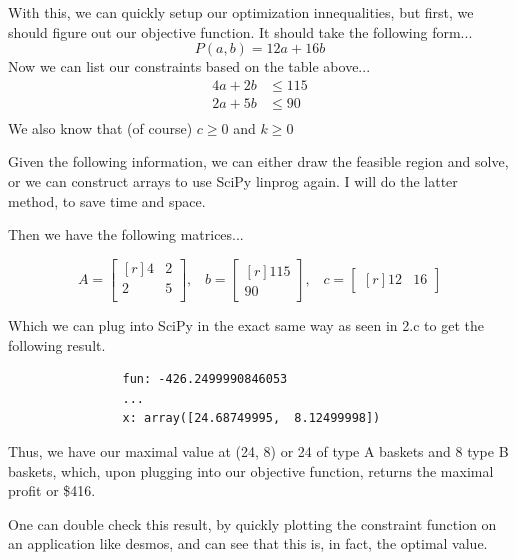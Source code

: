 \documentclass[11pt]{article}
\begin{document}
\begin{enumerate}
\begin{enumerate}
        With this, we can quickly setup our optimization innequalities, but
        first, we should figure out our objective function. It should take the
        following form...
        \[P(a,b) = 12a + 16b\]
        Now we can list our constraints based on the table above...
        \begin{align*}
            4a + 2b &\leq 115   \\
            2a + 5b &\leq 90    \\
        \end{align*}
        We also know that (of course) $c \geq 0$ and $k \geq 0$

        Given the following information, we can either draw the feasible region
        and solve, or we can construct arrays to use SciPy linprog again. I
        will do the latter method, to save time and space. 

        Then we have the following matrices...

        \[
            A = 
            \begin{bmatrix}[r]
                4   &   2   \\
                2   &   5   \\
            \end{bmatrix}, \;\;\;
            b = 
            \begin{bmatrix}[r] 
                115 \\
                90  
            \end{bmatrix}, \;\;\;
            c = 
            \begin{bmatrix}[r]
                12 & 16                
            \end{bmatrix}
        \]

        Which we can plug into SciPy in the exact same way as seen in 2.c to
        get the following result.

        
            \begin{center}
            \begin{verbatim}
                fun: -426.2499990846053
                ...
                x: array([24.68749995,  8.12499998])
            \end{verbatim}
            \end{center}

        Thus, we have our maximal value at (24, 8) or 24 of type A baskets and
        8 type B baskets, which, upon plugging into our objective function,
        returns the maximal profit or \$416.

        One can double check this result, by quickly plotting the constraint
        function on an application like desmos, and can see that this is, in
        fact, the optimal value.


    \end{enumerate}
    

    

\end{enumerate}
\end{document}
